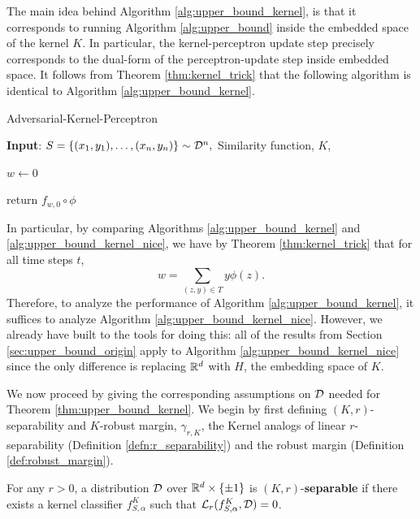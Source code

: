 The main idea behind Algorithm \ref{alg:upper_bound_kernel}, is that it corresponds to running Algorithm \ref{alg:upper_bound} inside the embedded space of the kernel $K$. In particular, the kernel-perceptron update step precisely corresponds to the dual-form of the perceptron-update step inside embedded space. It follows from Theorem \ref{thm:kernel_trick} that the following algorithm is identical to Algorithm \ref{alg:upper_bound_kernel}.

\begin{algorithm}[H]
   \caption{Adversarial-Kernel-Perceptron}
   \label{alg:upper_bound_kernel_nice}

    \textbf{Input}:  $S = \{(x_1, y_1), \dots, (x_n, y_n)\} \sim {\mathcal D}^n,$ Similarity function, $K$,
    
    $w \leftarrow 0$
    
    return $f_{w,0} \circ \phi$

\end{algorithm}

In particular, by comparing Algorithms \ref{alg:upper_bound_kernel} and \ref{alg:upper_bound_kernel_nice}, we have by Theorem \ref{thm:kernel_trick} that for all time steps $t$, $$w = \sum_{(z,y) \in T} y\phi(z).$$ Therefore, to analyze the performance of Algorithm \ref{alg:upper_bound_kernel}, it suffices to analyze Algorithm \ref{alg:upper_bound_kernel_nice}. However, we already have built to the tools for doing this: all of the results from Section \ref{sec:upper_bound_origin} apply to Algorithm \ref{alg:upper_bound_kernel_nice} since the only difference is replacing $\mathbb R^d$ with $H$, the embedding space of $K$. 

We now proceed by giving the corresponding assumptions on ${\mathcal D}$ needed for Theorem \ref{thm:upper_bound_kernel}. We begin by first defining $(K, r)$-separability and $K$-robust margin, $\gamma_{r, K}$, the Kernel analogs of linear $r$-separability (Definition \ref{defn:r_separability}) and the robust margin (Definition \ref{def:robust_margin}). 


\begin{defn}\label{defn:ker_r_separability}
For any $r > 0$, a distribution ${\mathcal D}$ over $\mathbb R^d \times \{\pm 1\}$ is $(K, r)$-\textbf{separable} if there exists a kernel classifier $f_{S, \alpha}^K$ such that $\mathcal L_r(f_{S, \alpha}^K, {\mathcal D}) = 0$.
\end{defn}

